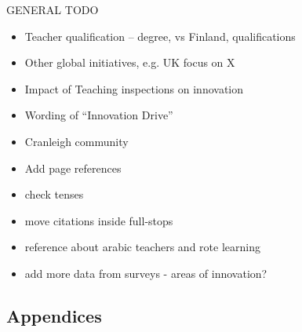 GENERAL TODO
\begin{itemize}
\item Teacher qualification – degree, vs Finland, qualifications
\item Other global initiatives, e.g. UK focus on X
\item Impact of Teaching inspections on innovation
\item Wording of “Innovation Drive”
\item Cranleigh community
\item Add page references
\item check tenses
\item move citations inside full-stops
\item reference about arabic teachers and rote learning
\item add more data from surveys - areas of innovation?
\end{itemize}

\subsection{Appendices}

